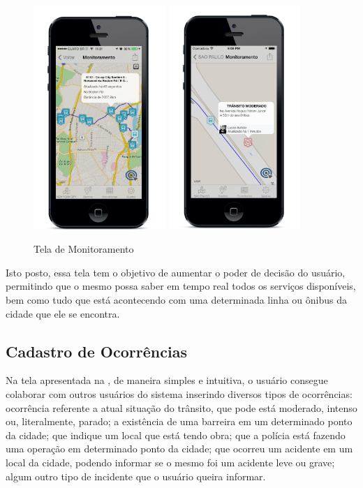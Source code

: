 \begin{figure}[htp]
\begin{center}
  \includegraphics[width=5cm]{images/telas/monitoramento1.png}
  \includegraphics[width=5cm]{images/telas/monitoramento2.png}
  \caption{Tela de Monitoramento}
  \label{fig:telaMonitoramento}
\end{center}
\end{figure}

Isto posto, essa tela tem o objetivo de aumentar o poder de decisão do usuário, permitindo que o mesmo possa saber em tempo real todos os serviços disponíveis, bem como tudo que está acontecendo com uma determinada linha ou ônibus da cidade que ele se encontra.

\subsection{Cadastro de Ocorrências}

Na tela apresentada na , de maneira simples e intuitiva, o usuário consegue colaborar com outros usuários do sistema inserindo diversos tipos de ocorrências: ocorrência referente a atual situação do trânsito, que pode está moderado, intenso ou, literalmente, parado; a existência de uma barreira em um determinado ponto da cidade; que indique um local que está tendo obra; que a polícia está fazendo uma operação em determinado ponto da cidade; que ocorreu um acidente em um local da cidade, podendo informar se o mesmo foi um acidente leve ou grave; algum outro tipo de incidente que o usuário queira informar.
	
